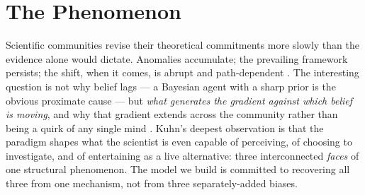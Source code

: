 %
%
%
%

\section{The Phenomenon}
\label{sec:phenomenon}

Scientific communities revise their theoretical commitments more
slowly than the evidence alone would dictate. Anomalies accumulate;
the prevailing framework persists; the shift, when it comes, is
abrupt and path-dependent \citep{kuhn1962Structure}. The interesting
question is not why belief lags --- a Bayesian agent with a sharp
prior is the obvious proximate cause --- but \emph{what generates
the gradient against which belief is moving}, and why that gradient
extends across the community rather than being a quirk of any single
mind \citep{planck1949Autobiography,bourdieu1975ScientificField}.
Kuhn's deepest observation is that the paradigm shapes what the
scientist is even capable of perceiving, of choosing to investigate,
and of entertaining as a live alternative: three interconnected
\emph{faces} of one structural phenomenon. The model we build is
committed to recovering all three from one mechanism, not from three
separately-added biases.

